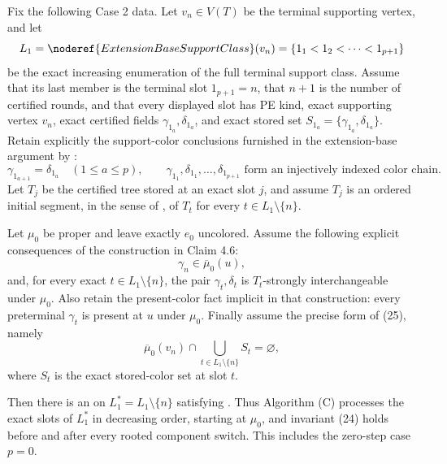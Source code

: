 \begin{lemma}
Fix the following Case 2 data.  Let \(v_n\in V(T)\) be the terminal
supporting vertex, and let
\[
 L_1=\noderef{ExtensionBaseSupportClass}(v_n)
      =\{1_1<1_2<\cdots<1_{p+1}\}
\]
be the exact increasing enumeration of the full terminal support class.
Assume that its last member is the terminal slot
\(1_{p+1}=n\), that \(n+1\) is the number of certified rounds, and
that every displayed slot has PE kind, exact supporting vertex \(v_n\),
exact certified fields \(\gamma_{1_a},\delta_{1_a}\), and exact stored
set \(S_{1_a}=\{\gamma_{1_a},\delta_{1_a}\}\).  Retain
explicitly the support-color conclusions furnished in the extension-base
argument by :
\[
 \gamma_{1_{a+1}}=\delta_{1_a}\quad(1\leq a\leq p),
 \qquad
 \gamma_{1_1},\delta_{1_1},\ldots,\delta_{1_{p+1}}
 \text{ form an injectively indexed color chain}.             \tag{1}
\]
Let \(T_j\) be the certified tree stored at an exact slot \(j\), and
assume \(T_j\) is an ordered initial segment, in the sense of
, of \(T_t\) for every
\(t\in L_1\setminus\{n\}\).

Let \(\mu_0\) be proper and leave exactly \(e_0\) uncolored.  Assume
the following explicit consequences of the construction in Claim 4.6:
\[
 \gamma_n\in\overline\mu_0(u),                               \tag{2}
\]
and, for every exact \(t\in L_1\setminus\{n\}\), the pair
\(\gamma_t,\delta_t\) is \(T_t\)-strongly interchangeable under
\(\mu_0\).  Also retain the present-color fact implicit in that
construction: every preterminal \(\gamma_t\) is present at \(u\) under
\(\mu_0\).  Finally assume the precise form of (25), namely
\[
 \overline\mu_0(v_n)\cap
   \bigcup_{t\in L_1\setminus\{n\}}S_t=\varnothing,           \tag{3}
\]
where \(S_t\) is the exact stored-color set at slot \(t\).

Then there is an  on
\(L_1^*=L_1\setminus\{n\}\) satisfying
.  Thus Algorithm (C) processes
the exact slots of \(L_1^*\) in decreasing order, starting at \(\mu_0\),
and invariant (24) holds before and after every rooted component switch.
This includes the zero-step case \(p=0\).
\end{lemma}

